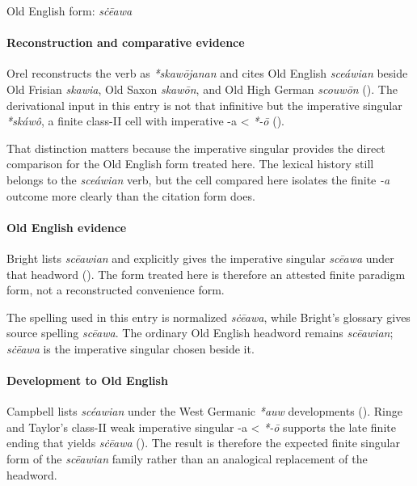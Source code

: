 \documentclass[
  british,
  a4paper,
]{article}
\begin{document}
Old English form: \emph{sċēawa}

\paragraph{Reconstruction and comparative
evidence}\label{reconstruction-and-comparative-evidence-65}

Orel reconstructs the verb as \emph{*skawōjanan} and cites Old English
\emph{sceáwian} beside Old Frisian \emph{skawia}, Old Saxon
\emph{skawōn}, and Old High German \emph{scouwōn}
(). The derivational input in
this entry is not that infinitive but the imperative singular
\emph{*skáwô}, a finite class-II cell with imperative -a \textless{}
\emph{*-ō} ().

That distinction matters because the imperative singular provides the
direct comparison for the Old English form treated here. The lexical
history still belongs to the \emph{sceáwian} verb, but the cell compared
here isolates the finite \emph{-a} outcome more clearly than the
citation form does.

\paragraph{Old English evidence}\label{old-english-evidence-65}

Bright lists \emph{scēawian} and explicitly gives the imperative
singular \emph{scēawa} under that headword
(). The form
treated here is therefore an attested finite paradigm form, not a
reconstructed convenience form.

The spelling used in this entry is normalized \emph{sċēawa}, while
Bright's glossary gives source spelling \emph{scēawa}. The ordinary Old
English headword remains \emph{scēawian}; \emph{sċēawa} is the
imperative singular chosen beside it.

\paragraph{Development to Old
English}\label{development-to-old-english-65}

Campbell lists \emph{scéawian} under the West Germanic \emph{*auw}
developments ().
Ringe and Taylor's class-II weak imperative singular -a \textless{}
\emph{*-ō} supports the late finite ending that yields \emph{sċēawa}
(). The result
is therefore the expected finite singular form of the \emph{scēawian}
family rather than an analogical replacement of the headword.
\end{document}
